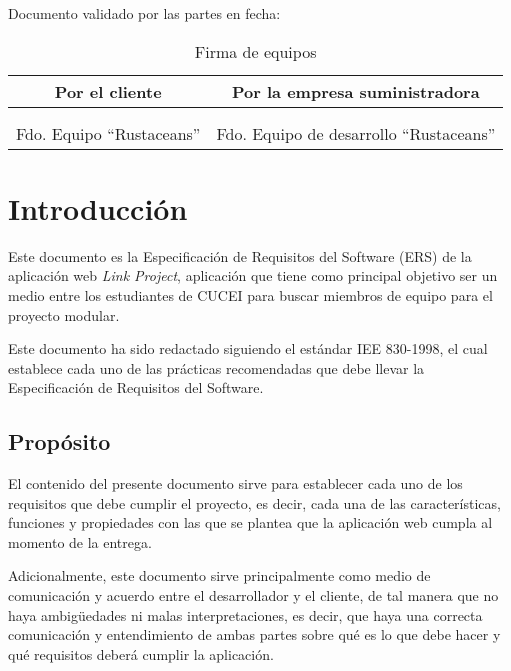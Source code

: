 	Documento validado por las partes en fecha: \startDate

	\begin{table}[h!]
		\centering
		\begin{tabular}{|c|c|}
			\hline
			\textbf{Por el cliente}    & \textbf{Por la empresa suministradora}   \\
			\hline
			                           &                                          \\
			                           &                                          \\
			\hline
			Fdo. Equipo ``Rustaceans'' & Fdo. Equipo de desarrollo ``Rustaceans'' \\
			\hline
		\end{tabular}
		\caption{Firma de equipos}
	\end{table}

	\clearpage
	\section{Introducción}

	Este documento es la Especificación de Requisitos del Software (ERS) de la aplicación
	web \emph{Link Project}, aplicación que tiene como principal objetivo ser un medio
	entre los estudiantes de CUCEI para buscar miembros de equipo para el proyecto
	modular.

	Este documento ha sido redactado siguiendo el estándar IEE 830-1998, el cual
	establece cada uno de las prácticas recomendadas que debe llevar la
	Especificación de Requisitos del Software.

	\subsection{Propósito}

	El contenido del presente documento sirve para establecer cada uno de los requisitos
	que debe cumplir el proyecto, es decir, cada una de las características,
	funciones y propiedades con las que se plantea que la aplicación web cumpla al
	momento de la entrega.

	Adicionalmente, este documento sirve principalmente como medio de comunicación
	y acuerdo entre el desarrollador y el cliente, de tal manera que no haya
	ambigüedades ni malas interpretaciones, es decir, que haya una correcta
	comunicación y entendimiento de ambas partes sobre qué es lo que debe hacer y
	qué requisitos deberá cumplir la aplicación.

